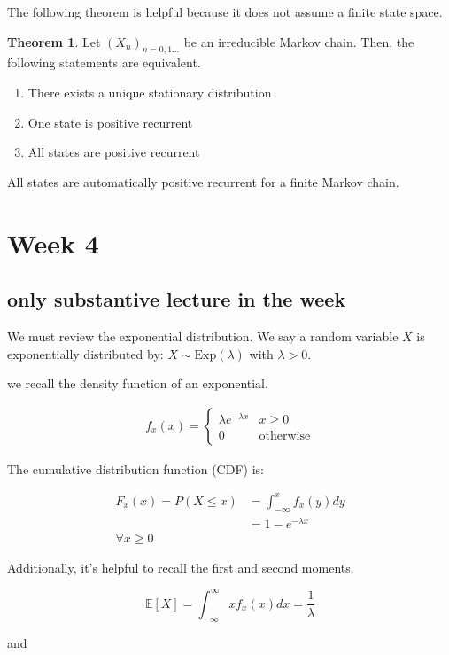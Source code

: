 \documentclass[12pt]{article}
\theoremstyle{definition}
\newtheorem{theorem}{Theorem}[section]
\begin{document}
The following theorem is helpful because it does not assume a finite state space.
\begin{theorem}
  Let $(X_n)_{n=0,1...}$ be an irreducible Markov chain. Then, the following statements are equivalent.
  \begin{enumerate}
    \item There exists a unique stationary distribution
    \item One state is positive recurrent
    \item All states are positive recurrent
  \end{enumerate}
\end{theorem}

All states are automatically positive recurrent for a finite Markov chain.

\section{Week 4}
\subsection{only substantive lecture in the week}

We must review the exponential distribution. We say a random variable $X$ is exponentially distributed by: $X \sim \text{Exp}(\lambda)$ with $\lambda > 0$.

we recall the density function of an exponential.

\begin{align*}
  f_x(x) = \begin{cases}
    \lambda e^{-\lambda x} & x \geq 0 \\
    0 & \text{otherwise}
  \end{cases}
\end{align*}

The cumulative distribution function (CDF) is:

\begin{align*}
  F_x(x) = P(X \leq x) &= \int_{-\infty}^x f_x(y) dy \\
  &= 1-e^{-\lambda x} \\
  \forall x \geq 0
\end{align*}

Additionally, it's helpful to recall the first and second moments.

$$
  \mathbb{E}[X] = \int_{-\infty}^\infty x f_x(x) dx = \frac{1}{\lambda}
$$

and
\end{document}
